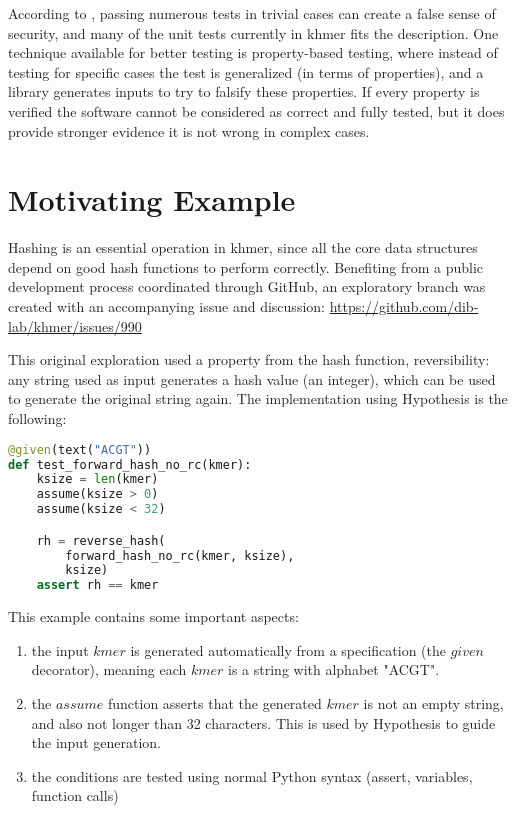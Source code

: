 \documentclass[preprint,nocopyrightspace]{sig-alternate}
\begin{document}
According to \citet{claessen_quickcheck:_2011},
passing numerous tests in trivial cases can create a false sense of security,
and many of the unit tests currently in khmer fits the description.
One technique available for better testing is property-based testing,
where instead of testing for specific cases the test is generalized (in terms of properties),
and a library generates inputs to try to falsify these properties.
If every property is verified the software cannot be considered as correct and fully tested,
but it does provide stronger evidence it is not wrong in complex cases.

\section{Motivating Example}

Hashing is an essential operation in khmer,
since all the core data structures depend on good hash functions to perform correctly.
Benefiting from a public development process coordinated through GitHub,
an exploratory branch was created with an accompanying issue and discussion:
\url{https://github.com/dib-lab/khmer/issues/990}

This original exploration used a property from the hash function,
reversibility:
any string used as input generates a hash value (an integer),
which can be used to generate the original string again.
The implementation using Hypothesis is the following:

\begin{lstlisting}[language=Python,basicstyle=\small\tt,caption={Motivating example: testing a reversible hash function},label={revhash}]
@given(text("ACGT"))
def test_forward_hash_no_rc(kmer):
    ksize = len(kmer)
    assume(ksize > 0)
    assume(ksize < 32)

    rh = reverse_hash(
        forward_hash_no_rc(kmer, ksize),
        ksize)
    assert rh == kmer
\end{lstlisting}

This example contains some important aspects:
\begin{enumerate}
\item the input $kmer$ is generated automatically from a specification (the $given$ decorator),
meaning each $kmer$ is a string with alphabet "ACGT".
\item the $assume$ function asserts that the generated $kmer$ is not an empty string,
and also not longer than 32 characters.
This is used by Hypothesis to guide the input generation.
\item the conditions are tested using normal Python syntax (assert, variables, function calls)
\end{enumerate}
\end{document}
